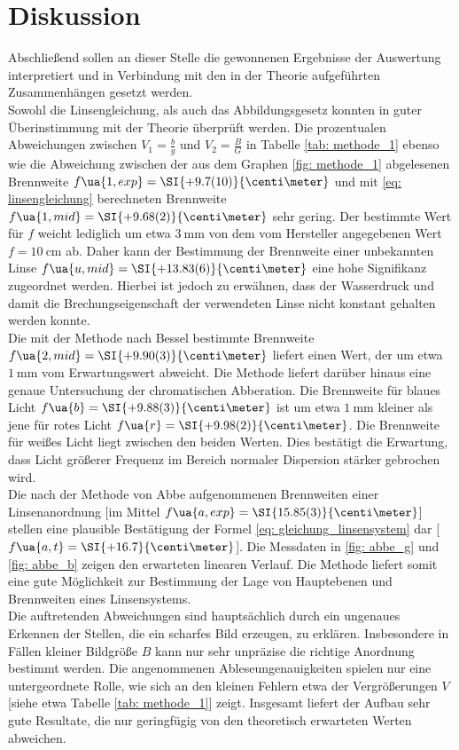 \section{Diskussion}
Abschließend sollen an dieser Stelle die gewonnenen Ergebnisse der Auswertung interpretiert und
in Verbindung mit den in der Theorie aufgeführten Zusammenhängen gesetzt werden.\\
Sowohl die Linsengleichung, als auch das Abbildungsgesetz konnten in guter Überinstimmung
mit der Theorie überprüft werden. Die prozentualen Abweichungen zwischen $V_1 = \frac{b}{g}$ und $V_2 = \frac{B}{G}$ %
in Tabelle \ref{tab: methode_1} ebenso wie die Abweichung zwischen der aus dem Graphen \ref{fig: methode_1} abgelesenen Brennweite $f\ua{1, exp} = \SI{+9.7(10)}{\centi\meter}$ und mit \eqref{eq: linsengleichung} %
berechneten Brennweite $  f\ua{1, mid} = \SI{+9.68(2)}{\centi\meter}$ sehr gering. Der bestimmte Wert für $f$ weicht lediglich um etwa $\SI{3}{\milli\meter}$ von dem vom Hersteller
angegebenen Wert $f = \SI{10}{\centi\meter}$ ab. Daher kann der Bestimmung der Brennweite einer unbekannten Linse $  f\ua{u, mid} = \SI{+13.83(6)}{\centi\meter}$
eine hohe Signifikanz zugeordnet werden. Hierbei ist jedoch zu erwähnen, dass der Wasserdruck und damit die Brechungseigenschaft der %
verwendeten Linse nicht konstant gehalten werden konnte. \\ %
Die mit der Methode nach Bessel bestimmte Brennweite $f\ua{2, mid} = \SI{+9.90(3)}{\centi\meter}$ liefert einen Wert, der um etwa $\SI{1}{\milli\meter}$ vom Erwartungswert abweicht. Die Methode
liefert darüber hinaus eine genaue Untersuchung der chromatischen Abberation. Die Brennweite für blaues Licht $f\ua{b} = \SI{+9.88(3)}{\centi\meter}$ ist um etwa
$\SI{1}{\milli\meter}$ kleiner als jene für rotes Licht $f\ua{r} = \SI{+9.98(2)}{\centi\meter}$. Die Brennweite für weißes Licht liegt
zwischen den beiden Werten. Dies bestätigt die Erwartung, dass Licht größerer Frequenz im Bereich %
normaler Dispersion stärker gebrochen wird.\\
Die nach der Methode von Abbe aufgenommenen Brennweiten einer Linsenanordnung [im Mittel $f\ua{a, exp} = \SI{15.85(3)}{\centi\meter}$] stellen eine plausible Bestätigung der Formel
\eqref{eq: gleichung_linsensystem} dar [$f\ua{a, t} = \SI{+16.7}{\centi\meter}$]. Die Messdaten in \ref{fig: abbe_g} und \ref{fig: abbe_b} zeigen den erwarteten linearen Verlauf.
Die Methode liefert somit eine gute Möglichkeit zur Bestimmung der Lage von Hauptebenen und Brennweiten eines Linsensystems.\\
Die auftretenden Abweichungen sind hauptsächlich durch ein ungenaues Erkennen der Stellen, die ein scharfes Bild erzeugen, zu erklären.
Insbesondere in Fällen kleiner Bildgröße $B$ kann nur sehr unpräzise die richtige Anordnung bestimmt werden. Die angenommenen Ableseungenauigkeiten
spielen nur eine untergeordnete Rolle, wie sich an den kleinen Fehlern etwa der Vergrößerungen $V$ [siehe etwa Tabelle \ref{tab: methode_1}] zeigt. %
Insgesamt liefert der Aufbau sehr gute Resultate, die nur geringfügig von den theoretisch erwarteten Werten abweichen. %
